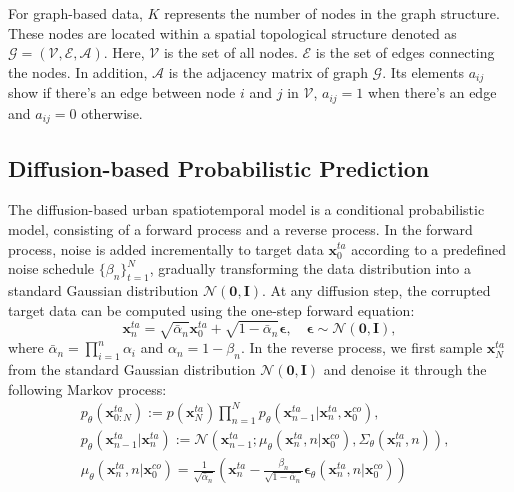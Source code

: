 For graph-based data, \(K\) represents the number of nodes in the graph structure. These nodes are located within a spatial topological structure denoted as $\mathcal{G}=(\mathcal{V}, \mathcal{E},\mathcal{A})$. Here, $\mathcal{V}$ is the set of all nodes. $\mathcal{E}$ is the set of edges connecting the nodes. In addition, $\mathcal{A}$ is the adjacency matrix of graph $\mathcal{G}$. Its elements $a_{ij}$ show if there's an edge between node $i$ and $j$ in $\mathcal{V}$, $a_{ij}=1$ when there's an edge and $a_{ij}=0$ otherwise.





\subsection{Diffusion-based Probabilistic Prediction}
The diffusion-based urban spatiotemporal model is a conditional probabilistic model, consisting of a forward process and a reverse process. In the forward process, noise is added incrementally to target data \(\mathbf{x}^{ta}_0\) according to a predefined noise schedule \(\{\beta_n\}_{t=1}^{N}\), gradually transforming the data distribution into a standard Gaussian distribution \(\mathcal{N}(\mathbf{0}, \mathbf{I})\). At any diffusion step, the corrupted target data can be computed using the one-step forward equation:
\begin{equation}
\label{eq:one-step-forward}
    \mathbf{x}_n^{ta} = \sqrt{\bar{\alpha}_n} \mathbf{x}_0^{ta} + \sqrt{1 - \bar{\alpha}_n} \mathbf{\epsilon}, \quad \mathbf{\epsilon} \sim \mathcal{N}(\mathbf{0}, \mathbf{I}),
\end{equation}
where \(\bar{\alpha}_n=\prod_{i=1}^{n}\alpha_i\) and \(\alpha_n=1-\beta_n\). In the reverse process, we first sample \(\mathbf{x}^{ta}_N\) from the standard Gaussian distribution \(\mathcal{N}(\mathbf{0}, \mathbf{I})\) and denoise it through the following Markov process:
\begin{equation}
\label{eq:inference}
\begin{aligned}
    &p_{\theta}(\mathbf{x}_{0:N}^{ta}) := p(\mathbf{x}_N^{ta}) \prod_{n=1}^{N} p_{\theta}(\mathbf{x}_{n-1}^{ta} | \mathbf{x}_n^{ta}, \mathbf{x}_0^{co}), \\
    &p_{\theta}(\mathbf{x}_{n-1}^{ta} | \mathbf{x}_n^{ta}) := \mathcal{N}(\mathbf{x}_{n-1}^{ta}; \mu_{\theta}(\mathbf{x}_n^{ta}, n| \mathbf{x}_0^{co}), \Sigma_{\theta}(\mathbf{x}_n^{ta}, n)),\\
    &\mu_{\theta}(\mathbf{x}_n^{ta}, n| \mathbf{x}_0^{co})=\frac{1}{\sqrt{\bar{\alpha}_n}} \left( \mathbf{x}_n^{ta} - \frac{\beta_n}{\sqrt{1 - \bar{\alpha}_n}} \mathbf{\epsilon}_{\theta}(\mathbf{x}_n^{ta}, n| \mathbf{x}_0^{co}) \right)
\end{aligned}
\end{equation}
